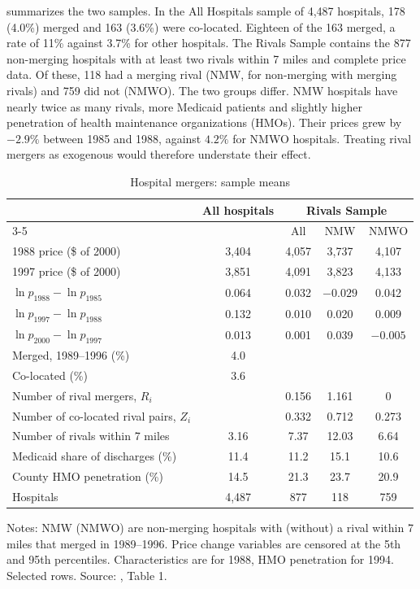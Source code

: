  summarizes the two samples. In the All Hospitals sample of 4,487 hospitals, 178 (4.0\%)
merged and 163 (3.6\%) were co-located. Eighteen of the 163 merged, a rate of 11\% against 3.7\% for other hospitals.
The Rivals Sample contains the 877 non-merging hospitals with at least two rivals within 7 miles and complete price
data. Of these, 118 had a merging rival (NMW, for non-merging with merging rivals) and 759 did not (NMWO). The two
groups differ. NMW hospitals have nearly twice as many rivals, more Medicaid patients and slightly higher penetration of health maintenance organizations (HMOs).
Their prices grew by $-2.9\%$ between 1985 and 1988, against $4.2\%$ for NMWO hospitals. Treating rival mergers as
exogenous would therefore understate their effect.

\begin{table}[htbp]
\centering
\caption{Hospital mergers: sample means}
\label{tab:11-dafny-data}
\footnotesize
\begin{tabular}{@{}lcccc@{}}
\toprule
& All hospitals & \multicolumn{3}{c}{Rivals Sample} \\
\cmidrule(l){3-5}
& & All & NMW & NMWO \\
\midrule
1988 price (\$ of 2000) & 3,404 & 4,057 & 3,737 & 4,107 \\
1997 price (\$ of 2000) & 3,851 & 4,091 & 3,823 & 4,133 \\
$\ln p_{1988}-\ln p_{1985}$ & 0.064 & 0.032 & $-0.029$ & 0.042 \\
$\ln p_{1997}-\ln p_{1988}$ & 0.132 & 0.010 & 0.020 & 0.009 \\
$\ln p_{2000}-\ln p_{1997}$ & 0.013 & 0.001 & 0.039 & $-0.005$ \\
Merged, 1989--1996 (\%) & 4.0 & & & \\
Co-located (\%) & 3.6 & & & \\
Number of rival mergers, $R_i$ & & 0.156 & 1.161 & 0 \\
Number of co-located rival pairs, $Z_i$ & & 0.332 & 0.712 & 0.273 \\
Number of rivals within 7 miles & 3.16 & 7.37 & 12.03 & 6.64 \\
Medicaid share of discharges (\%) & 11.4 & 11.2 & 15.1 & 10.6 \\
County HMO penetration (\%) & 14.5 & 21.3 & 23.7 & 20.9 \\
Hospitals & 4,487 & 877 & 118 & 759 \\
\bottomrule
\end{tabular}

\smallskip
\begin{minipage}{0.9\linewidth}
\footnotesize Notes: NMW (NMWO) are non-merging hospitals with (without) a rival within 7 miles that merged in
1989--1996. Price change variables are censored at the 5th and 95th percentiles. Characteristics are for 1988,
HMO penetration for 1994. Selected rows. Source: \citet{Dafny2005}, Table 1.
\end{minipage}
\end{table}

